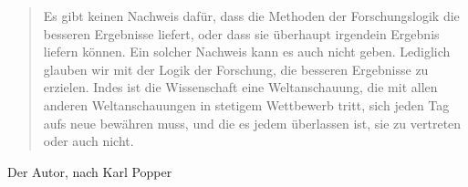 \documentclass[11pt,oneside,a4paper]{scrreprt}
\begin{document}
\pagebreak
\vspace*{20ex}
\begin{quote}
	Es gibt keinen Nachweis dafür, dass die Methoden der Forschungslogik die besseren Ergebnisse liefert, oder dass sie überhaupt irgendein Ergebnis liefern können. Ein solcher Nachweis kann es auch nicht geben. Lediglich glauben wir mit der Logik der Forschung, die besseren Ergebnisse zu erzielen. Indes ist die Wissenschaft eine Weltanschauung, die mit allen anderen Weltanschauungen in stetigem Wettbewerb tritt, sich jeden Tag aufs neue bewähren muss, und die es jedem überlassen ist, sie zu vertreten oder auch nicht.
\end{quote}
\begin{flushright}
	Der Autor, nach Karl Popper
\end{flushright}
\pagebreak

\tableofcontents
\end{document}

